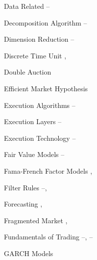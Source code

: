 \begin{multicols}{2}
{Data Related \hfill \pageref{in:data_related1}--\pageref{in:data_related2} \par

Decomposition Algorithm \hfill \pageref{in:decomp1}--\pageref{in:decomp2} \par %

Dimension Reduction \hfill \pageref{in:dimred1}--\pageref{in:dimred2} \par

Discrete Time Unit \hfill \pageref{in:disc_time_unit1}, \pageref{in:disc_time_unit2} \par

Double Auction \hfill \pageref{in:double} \par

Efficient Market Hypothesis \hfill \pageref{in:efficient} \par

Execution Algorithms \hfill \pageref{in:exec_alg1}--\pageref{in:exec_alg2} \par

Execution Layers \hfill \pageref{in:exec_layer1}--\pageref{in:exec_layer2} \par

Execution Technology \hfill \pageref{in:exec_tech1}--\pageref{in:exec_tech2} \par

Fair Value Models \hfill \pageref{in:fvm1}--\pageref{in:fvm2} \par

Fama-French Factor Models \hfill \pageref{in:fama1}, \pageref{in:fama2} \par

Filter Rules \hfill \pageref{in:filter1}--\pageref{in:filter2}, \pageref{in:filter3} \par

Forecasting \hfill \pageref{in:forecast1}, \pageref{in:forecast2} \par

Fragmented Market \hfill \pageref{in:fragmented}, \pageref{in:fragmented_market} \par

Fundamentals of Trading \hfill \pageref{in:fund_trade1}--\pageref{in:fund_trade2}, \pageref{in:fund_trade3}--\pageref{in:fund_trade4} \par

GARCH Models \hfill \pageref{in:garch_model} \par

}
\end{multicols}
